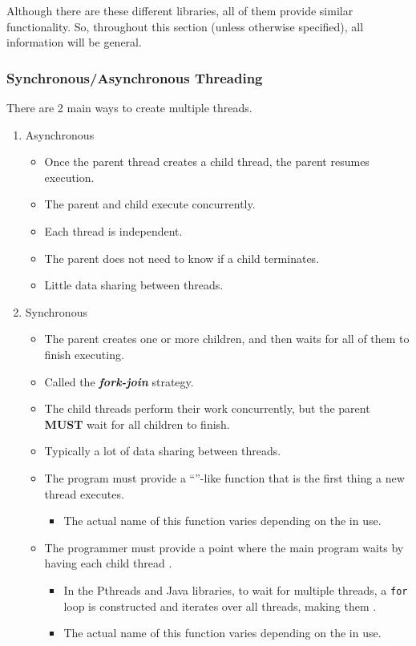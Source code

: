 Although there are these different libraries, all of them provide similar functionality.
So, throughout this section (unless otherwise specified), all information will be general.

\subsubsection{Synchronous/Asynchronous Threading}\label{subsubsec:Sync_Async_Threading}
There are 2 main ways to create multiple threads.
\begin{enumerate}[noitemsep]
\item Asynchronous
  \begin{itemize}[noitemsep]
  \item Once the parent thread creates a child thread, the parent resumes execution.
  \item The parent and child execute concurrently.
  \item Each thread is independent.
  \item The parent does not need to know if a child terminates.
  \item Little data sharing between threads.
  \end{itemize}
\item Synchronous
  \begin{itemize}[noitemsep]
  \item The parent creates one or more children, and then waits for all of them to finish executing.
  \item Called the \textbf{\emph{fork-join}} strategy.
  \item The child threads perform their work concurrently, but the parent \textbf{MUST} wait for all children to finish.
  \item Typically a lot of data sharing between threads.
  \item The program must provide a ``''-like function that is the first thing a new thread executes.
    \begin{itemize}[noitemsep]
    \item The actual name of this function varies depending on the  in use.
    \end{itemize}
  \item The programmer must provide a point where the main program waits by having each child thread .
    \begin{itemize}[noitemsep]
    \item In the Pthreads and Java libraries, to wait for multiple threads, a \texttt{for} loop is constructed and iterates over all threads, making them .
    \item The actual name of this function varies depending on the  in use.
    \end{itemize}
  \end{itemize}
\end{enumerate}



